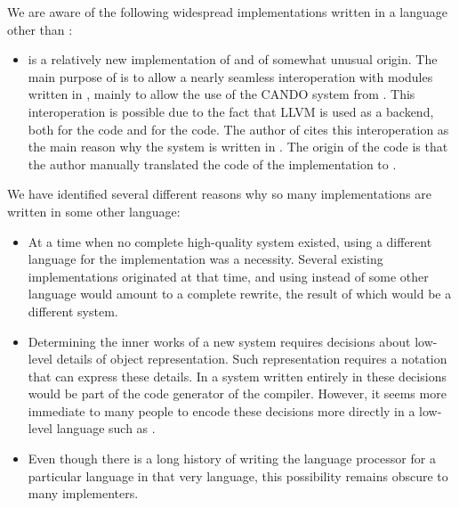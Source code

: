 We are aware of the following widespread implementations written in a
language other than \commonlisp{}:

\begin{itemize}
\item \clasp{} is a relatively new implementation of \commonlisp{} and
  of somewhat unusual origin.  The main purpose of \clasp{} is to
  allow a nearly seamless interoperation with modules written in
  \cplusplus{}, mainly to allow the use of the CANDO system from
  \commonlisp{}.  This interoperation is possible due to the fact that
  LLVM is used as a backend, both for the \cplusplus{} code and for
  the \commonlisp{} code.  The author of \clasp{} cites this
  interoperation as the main reason why the system is written in
  \cplusplus{}.  The origin of the \cplusplus{} code is that the
  author manually translated the \clanguage{} code of the \ecl{}
  \commonlisp{} implementation to \cplusplus{}.
\end{itemize}

We have identified several different reasons why so many \commonlisp{}
implementations are written in some other language:

\begin{itemize}
\item At a time when no complete high-quality \commonlisp{} system
  existed, using a different language for the implementation was a
  necessity.  Several existing implementations originated at that
  time, and using \commonlisp{} instead of some other language would
  amount to a complete rewrite, the result of which would be a
  different system.
\item Determining the inner works of a new \commonlisp{} system
  requires decisions about low-level details of object
  representation.  Such representation requires a notation that can
  express these details.  In a \commonlisp{} system written entirely
  in \commonlisp{} these decisions would be part of the code generator
  of the compiler.  However, it seems more immediate to many people to
  encode these decisions more directly in a low-level language such as
  \clanguage{}.
\item Even though there is a long history of writing the language
  processor for a particular language in that very language, this
  possibility remains obscure to many implementers.
\end{itemize}
